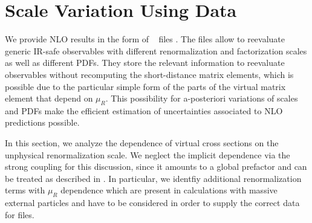 \section{Scale Variation Using \Ntuple{} Data}
\label{sec:scaledep}

We provide NLO results in the form of \root~\cite{ROOT} \ntuple{} files \cite{BH:Ntuples}. The \ntuple{} files allow to reevaluate
generic IR-safe observables with different renormalization and
factorization scales as well as different PDFs. They store the relevant information to
reevaluate observables without recomputing the short-distance matrix
elements, which is possible due to the particular simple form of the parts of the virtual matrix element that depend on $\mu_R$. This possibility for a-posteriori variations of scales and PDFs
make the efficient estimation of uncertainties associated to NLO
predictions possible. 

In this section, we analyze the dependence of virtual cross sections on the unphysical renormalization scale. We neglect the implicit dependence
via the strong coupling for this discussion, since it amounts to a global prefactor and can be
treated as described in \cite{BH:Ntuples}. In particular, we identfiy additional
renormalization terms with $\mu_R$ dependence which are present in calculations with massive external particles and have to be considered in order to supply the correct data for \ntuple{} files.

